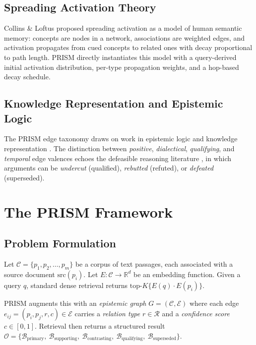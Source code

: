 \documentclass[11pt,a4paper]{article}
\begin{document}
\subsection{Spreading Activation Theory}

Collins \& Loftus \citep{collins1975spreading} proposed spreading activation
as a model of human semantic memory: concepts are nodes in a network,
associations are weighted edges, and activation propagates from cued concepts
to related ones with decay proportional to path length. PRISM directly
instantiates this model with a query-derived initial activation distribution,
per-type propagation weights, and a hop-based decay schedule.

\subsection{Knowledge Representation and Epistemic Logic}

The PRISM edge taxonomy draws on work in epistemic logic
\citep{fagin2003reasoning} and knowledge representation
\citep{brachman1985overview}. The distinction between \emph{positive},
\emph{dialectical}, \emph{qualifying}, and \emph{temporal} edge valences
echoes the defeasible reasoning literature \citep{pollock1995cognitive},
in which arguments can be \emph{undercut} (qualified), \emph{rebutted}
(refuted), or \emph{defeated} (superseded).


\section{The PRISM Framework}
\label{sec:framework}

\subsection{Problem Formulation}

Let $\mathcal{C} = \{p_1, p_2, \ldots, p_m\}$ be a corpus of text passages,
each associated with a source document $\text{src}(p_i)$.
Let $E : \mathcal{C} \to \mathbb{R}^d$ be an embedding function.
Given a query $q$, standard dense retrieval returns
$\text{top-}K\{E(q) \cdot E(p_i)\}$.

PRISM augments this with an \emph{epistemic graph}
$G = (\mathcal{C}, \mathcal{E})$ where each edge
$e_{ij} = (p_i, p_j, r, c) \in \mathcal{E}$ carries a
\emph{relation type} $r \in \mathcal{R}$ and a
\emph{confidence score} $c \in [0, 1]$.
Retrieval then returns a structured result
$\mathcal{O} = \{\mathcal{B}_\text{primary},\ \mathcal{B}_\text{supporting},\
\mathcal{B}_\text{contrasting},\ \mathcal{B}_\text{qualifying},\
\mathcal{B}_\text{superseded}\}$.
\end{document}
